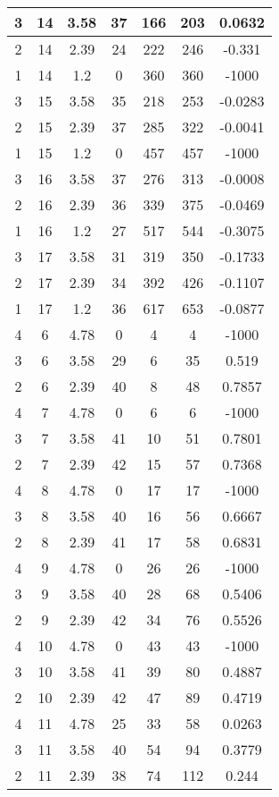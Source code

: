 \documentclass[letterpaper, 12pt]{article}
\begin{document}
\begin{longtable}{|c|c|c|c|c|c|c|}
\hline
3 & 14 & 3.58 & 37 & 166 & 203 & 0.0632 \\
\hline
2 & 14 & 2.39 & 24 & 222 & 246 & -0.331 \\
\hline
1 & 14 & 1.2 & 0 & 360 & 360 & -1000 \\
\hline
3 & 15 & 3.58 & 35 & 218 & 253 & -0.0283 \\
\hline
2 & 15 & 2.39 & 37 & 285 & 322 & -0.0041 \\
\hline
1 & 15 & 1.2 & 0 & 457 & 457 & -1000 \\
\hline
3 & 16 & 3.58 & 37 & 276 & 313 & -0.0008 \\
\hline
2 & 16 & 2.39 & 36 & 339 & 375 & -0.0469 \\
\hline
1 & 16 & 1.2 & 27 & 517 & 544 & -0.3075 \\
\hline
3 & 17 & 3.58 & 31 & 319 & 350 & -0.1733 \\
\hline
2 & 17 & 2.39 & 34 & 392 & 426 & -0.1107 \\
\hline
1 & 17 & 1.2 & 36 & 617 & 653 & -0.0877 \\
\hline
4 & 6 & 4.78 & 0 & 4 & 4 & -1000 \\
\hline
3 & 6 & 3.58 & 29 & 6 & 35 & 0.519 \\
\hline
2 & 6 & 2.39 & 40 & 8 & 48 & 0.7857 \\
\hline
4 & 7 & 4.78 & 0 & 6 & 6 & -1000 \\
\hline
3 & 7 & 3.58 & 41 & 10 & 51 & 0.7801 \\
\hline
2 & 7 & 2.39 & 42 & 15 & 57 & 0.7368 \\
\hline
4 & 8 & 4.78 & 0 & 17 & 17 & -1000 \\
\hline
3 & 8 & 3.58 & 40 & 16 & 56 & 0.6667 \\
\hline
2 & 8 & 2.39 & 41 & 17 & 58 & 0.6831 \\
\hline
4 & 9 & 4.78 & 0 & 26 & 26 & -1000 \\
\hline
3 & 9 & 3.58 & 40 & 28 & 68 & 0.5406 \\
\hline
2 & 9 & 2.39 & 42 & 34 & 76 & 0.5526 \\
\hline
4 & 10 & 4.78 & 0 & 43 & 43 & -1000 \\
\hline
3 & 10 & 3.58 & 41 & 39 & 80 & 0.4887 \\
\hline
2 & 10 & 2.39 & 42 & 47 & 89 & 0.4719 \\
\hline
4 & 11 & 4.78 & 25 & 33 & 58 & 0.0263 \\
\hline
3 & 11 & 3.58 & 40 & 54 & 94 & 0.3779 \\
\hline
2 & 11 & 2.39 & 38 & 74 & 112 & 0.244 \\

\end{longtable}
\end{document}
